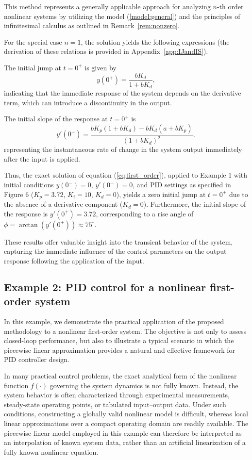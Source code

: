 \documentclass[preprint,12pt]{elsarticle}
\begin{document}
\begin{rem}\label{initialJumpandSlope}
This method represents a generally applicable approach for analyzing \(n\)-th order nonlinear systems by utilizing the model (\ref{model:general}) and the principles of infinitesimal calculus as outlined in Remark~\ref{rem:nonzero}. 

For the special case \(n = 1\), the solution yields the following expressions (the derivation of these relations is provided in Appendix~\ref{app:IJandIS}).

The initial jump at \(t = 0^+\) is given by
\[
y(0^+) = \frac{b K_d}{1 + b K_d},
\]
indicating that the immediate response of the system depends on the derivative 
term, which can introduce a discontinuity in the output.

The initial slope of the response at \(t = 0^+\) is
\[
y'(0^+) =  \frac{b K_p (1 + b K_d) - b K_d (a + b K_p)}{(1 + b K_d)^2},
\]
representing the instantaneous rate of change in the system output immediately after the input is applied.


Thus, the exact solution of equation (\ref{eq:first_order}), applied to Example 1 with initial conditions \( y(0^-) = 0 \), \( y'(0^-) = 0 \), and PID settings as specified in Figure 6 (\( K_p = 3.72 \), \( K_i = 10 \), \( K_d = 0 \)), yields a zero initial jump at \( t = 0^+ \) due to the absence of a derivative component (\( K_d = 0 \)). Furthermore, the initial slope of the response is \( y'(0^+) = 3.72 \), corresponding to a rise angle of \( \phi = \arctan(y'(0^+)) \approx 75^\circ \).

These results offer valuable insight into the transient behavior of the system, capturing the immediate influence of the control parameters on the output 
response following the application of the input.
\end{rem}
\subsection{Example 2: PID control for a nonlinear first-order system}\label{example_nonlinear}
In this example, we demonstrate the practical application of the proposed methodology to a nonlinear first-order system. The objective is not only to assess closed-loop performance, but also to illustrate a typical scenario in which the piecewise linear approximation provides a natural and effective framework for PID controller design.

In many practical control problems, the exact analytical form of the nonlinear function \( f(\cdot) \) governing the system dynamics is not fully known. Instead, the system behavior is often characterized through experimental measurements, steady-state operating points, or tabulated input--output data. Under such conditions, constructing a globally valid nonlinear model is difficult, whereas local linear approximations over a compact operating domain are readily available. The piecewise linear model employed in this example can therefore be interpreted as an interpolation of known system data, rather than an artificial linearization of a fully known nonlinear equation.
\end{document}

